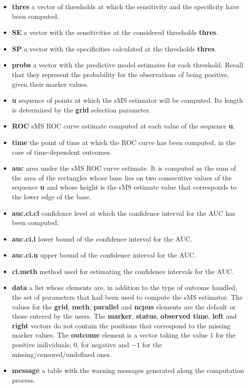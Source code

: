 \begin{itemize}
\item{\textbf{thres}} {a vector of thresholds at which the sensitivity and the specificity have been computed.}
\item{\textbf{SE}} {a vector with the sensitivities at the considered thresholds {\textbf{thres}}.}
\item{\textbf{SP}} {a vector with the specificities calculated at the thresholds {\textbf{thres}}.}
\item{\textbf{probs}} {a vector with the predictive model estimates for each threshold. Recall that they represent the probability for the observations of being positive, given their marker values.}
\item{\textbf{u}} {sequence of points at which the sMS estimator will be computed. Its length is determined by the {\textbf{grid}} selection parameter.}
\item{\textbf{ROC}} {sMS ROC curve estimate computed at each value of the sequence {\textbf{u}}.}
\item{\textbf{time}} {the point of time at which the ROC curve has been computed, in the case of time-dependent outcomes.}
\item{\textbf{auc}} {area under the sMS ROC curve estimate. It is computed as the sum of the area of the rectangles whose base lies on two consecutive values of the sequence {\textbf{u}} and whose height is the sMS estimate value that corresponds to the lower edge of the base.}
\item{\textbf{auc.ci.cl}} {confidence level at which the confidence interval for the AUC has been computed.}
\item{\textbf{auc.ci.l}} {lower bound of the confidence interval for the AUC.}
\item{\textbf{auc.ci.u}} {upper bound of the confidence interval for the AUC.}
\item{\textbf{ci.meth}} {method used for estimating the confidence intervals for the AUC.}
\item{\textbf{data}} {a list whose elements are, in addition to the type of outcome handled, the set of parameters that had been used to compute the sMS estimator. The values for the {\textbf{grid}}, {\textbf{meth}}, {\textbf{parallel}} and {\textbf{ncpus}} elements are the default or those entered by the users. The {\textbf{marker}}, {\textbf{status}}, {\textbf{observed time}}, {\textbf{left}} and {\textbf{right}} vectors do not contain the positions that correspond to the missing marker values. The {\textbf{outcome}} element is a vector taking the value $1$ for the positive individuals; $0$, for negative and $-1$ for the missing/censored/undefined ones.}
\item{\textbf{message}} {a table with the warning messages generated along the computation process.}
\end{itemize}


